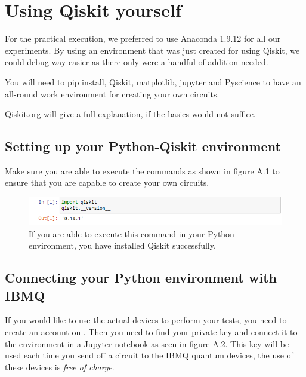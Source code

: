 
\chapter{Using Qiskit yourself}
\label{ch:appendix}

For the practical execution, we preferred to use Anaconda 1.9.12 for all our experiments. By using an environment that was just created for using Qiskit, we could debug way easier as there only were a handful of addition needed.

You will need to pip install, Qiskit, matplotlib, jupyter and Pyscience to have an all-round work environment for creating your own circuits.

Qiskit.org will give a full explanation, if the basics would not suffice.


\section{Setting up your Python-Qiskit environment}

Make sure you are able to execute the commands as shown in figure A.1 to ensure that you are capable to create your own circuits.

\begin{figure}
	\centering
	\includegraphics[scale = 0.75]{../Demonstration/img/Qiskit_version.PNG}
	\caption{If you are able to execute this command in your Python environment, you have installed Qiskit successfully.}
\end{figure}

\section{Connecting your Python environment with IBMQ}

If you would like to use the actual devices to perform your tests, you need to create an account on \href{https://quantum-computing.ibm.com/}. Then you need to find your private key and connect it to the environment in a Jupyter notebook as seen in figure A.2. This key will be used each time you send off a circuit to the IBMQ quantum devices, the use of these devices is \textit{free of charge}.


